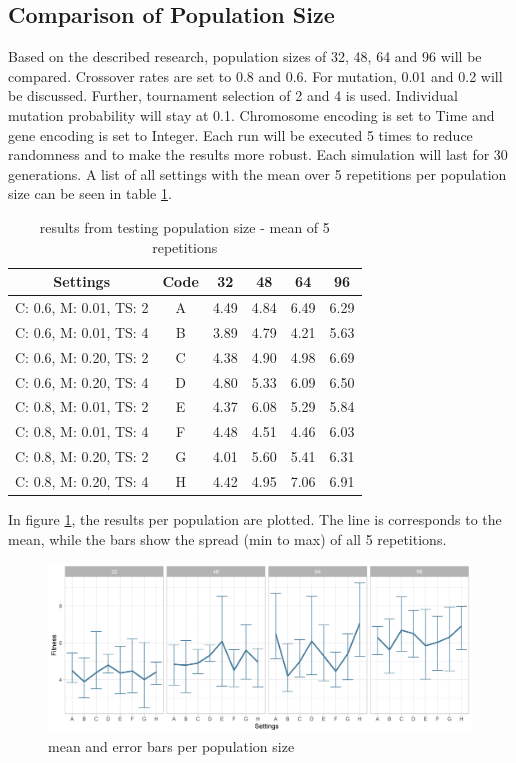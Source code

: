 

\subsection{Comparison of Population Size}
Based on the described research, population sizes of 32, 48, 64 and 96 will be compared. Crossover rates are set to 0.8 and 0.6. For mutation, 0.01 and 0.2 will be discussed. Further, tournament selection of 2 and 4 is used.
Individual mutation probability will stay at 0.1. Chromosome encoding is set to Time and gene encoding is set to Integer. 
Each run will be executed 5 times to reduce randomness and to make the results more robust. Each simulation will last for 30 generations. A list of all settings with the mean over 5 repetitions per population size can be seen in table \ref{tab:hyperparameter_tuning:pop_settings_results}.

\begin{table}[ht]
	\centering
	\begin{tabular}{ c|c|cccc  }
		\hline
		Settings & Code & 32 & 48 & 64 & 96\\
		\hline
		C: 0.6, M: 0.01, TS: 2   	& A & 4.49 & 4.84 & 6.49 & 6.29 \\
		C: 0.6, M: 0.01, TS: 4		& B & 3.89 & 4.79 & 4.21 & 5.63 \\ 
		C: 0.6, M: 0.20, TS: 2 		& C & 4.38 & 4.90 & 4.98 & 6.69 \\
		C: 0.6, M: 0.20, TS: 4    	& D & 4.80 & 5.33 & 6.09 & 6.50 \\
		C: 0.8, M: 0.01, TS: 2   	& E & 4.37 & 6.08 & 5.29 & 5.84 \\
		C: 0.8, M: 0.01, TS: 4		& F & 4.48 & 4.51 & 4.46 & 6.03 \\
		C: 0.8, M: 0.20, TS: 2 		& G & 4.01 & 5.60 & 5.41 & 6.31 \\
		C: 0.8, M: 0.20, TS: 4    	& H & 4.42 & 4.95 & 7.06 & 6.91 \\
		\hline
	\end{tabular}
	\caption{results from testing population size - mean of 5 repetitions}
	\label{tab:hyperparameter_tuning:pop_settings_results}
\end{table}

In figure \ref{fig:hyperparameter_tuning:population_results}, the results per population are plotted. The line is corresponds to the mean, while the bars show the spread (min to max) of all 5 repetitions.
\begin{figure}[ht] 
	\includegraphics[width=1\linewidth]{simulations/population/plots/comparison}
	\caption{mean and error bars per population size}
	\label{fig:hyperparameter_tuning:population_results}
\end{figure}

